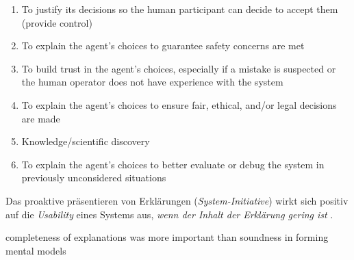 \begin{enumerate}
    \item To justify its decisions so the human participant can decide to accept them (provide control)
    \item To explain the agent’s choices to guarantee safety concerns are met
    \item To build trust in the agent’s choices, especially if a mistake is suspected or the human operator does not have experience with the system
    \item To explain the agent’s choices to ensure fair, ethical, and/or legal decisions are made
    \item Knowledge/scientific discovery
    \item To explain the agent’s choices to better evaluate or debug the system in previously unconsidered situations
\end{enumerate}

Das proaktive präsentieren von Erklärungen (\textit{System-Initiative}) wirkt sich positiv auf die \textit{Usability} eines Systems aus, \textit{wenn der Inhalt der Erklärung gering ist} \cite{wiegand2019drive}.

completeness of explanations was more important than soundness in forming mental models \cite{riveiro_thats_2021}